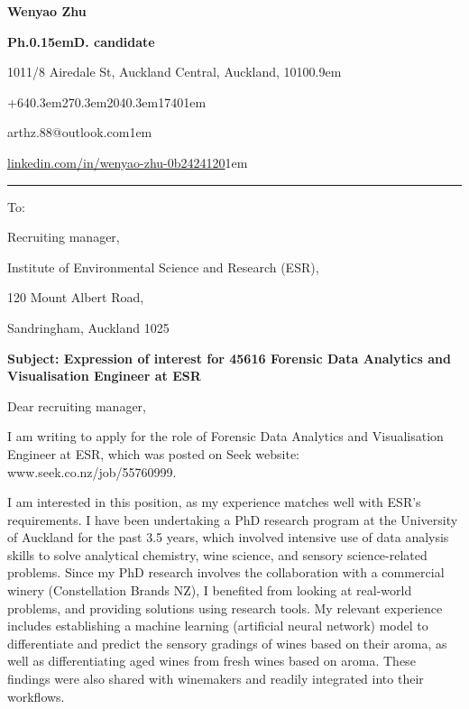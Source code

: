 \documentclass[11pt, a4paper, twoside]{article}
\begin{document}
\begin{minipage}[b]{0.38\textwidth}
  {\Huge \bfseries Wenyao Zhu}\par\vspace{0.7ex}
  {\large \bfseries Ph.\kern0.15emD. candidate}
  \end{minipage}\hfill
  \begin{minipage}[b]{0.6\textwidth}
  \raggedleft
  \footnotesize 1011/8 Airedale St, Auckland Central, Auckland, 1010\kern0.9em\faHome\par
  +64\kern0.3em27\kern0.3em204\kern0.3em1740\kern1em\faPhone\par
  arthz.88@outlook.com\kern1em\scalebox{0.88}{\faEnvelope}\par
  \href{https://www.linkedin.com/in/wenyao-zhu-0b2424120/}{linkedin.com/in/wenyao-zhu-0b2424120}\kern1em \scalebox{1.1}{\faLinkedinSquare}
\end{minipage}\vspace{-1.0ex}
\noindent\rule{\textwidth}{0.7pt}\par\vspace{0.8ex}
To:\par
Recruiting manager,\par
Institute of Environmental Science and Research (ESR),\par
120 Mount Albert Road,\par
Sandringham, Auckland 1025\par
\vspace{4ex}
\textbf{Subject: Expression of interest for 45616 Forensic Data Analytics and Visualisation Engineer at ESR}\par\vspace{2ex}

Dear recruiting manager,\par\vspace{2ex}

I am writing to apply for the role of Forensic Data Analytics and Visualisation Engineer at ESR, which was posted on Seek website: www.seek.co.nz/job/55760999.\par\vspace{2ex}

I am interested in this position, as my experience matches well with ESR's requirements. I have been undertaking a PhD research program at the University of Auckland for the past 3.5 years, which involved intensive use of data analysis skills to solve analytical chemistry, wine science, and sensory science-related problems. Since my PhD research involves the collaboration with a commercial winery (Constellation Brands NZ), I benefited from looking at real-world problems, and providing solutions using research tools. My relevant experience includes establishing a machine learning (artificial neural network) model to differentiate and predict the sensory gradings of wines based on their aroma, as well as differentiating aged wines from fresh wines based on aroma. These findings were also shared with winemakers and readily integrated into their workflows.\par\vspace{2ex}
\end{document}
